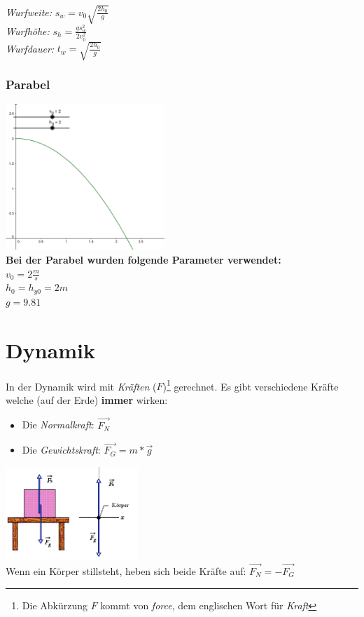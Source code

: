 \documentclass[10pt,a4paper,twoside]{article}
\begin{document}
	\begin{multicols}{2}
		\textit{Wurfweite:} \(s_w = v_0 \sqrt{ \frac{2h_0}{g} } \)\\
		\textit{Wurfhöhe:}  \(s_h = \frac{gs_w^2}{2v_0^2}\)\\
		\textit{Wurfdauer:} \(t_w = \sqrt{ \frac{2h_0}{g} }\)
	\end{multicols}
	
	\subsubsection{Parabel}
	
	\begin{multicols}{2}
		\includegraphics[width=6cm]{img/wurf_example}\\
		
		\textbf{Bei der Parabel wurden folgende Parameter verwendet:}\\
		\(v_0 = 2\frac{m}{s}\)\\
		\(h_0 = h_{y0} = 2m\)\\
		\(g = 9.81\)
	\end{multicols}
	\section{Dynamik}
	
	In der Dynamik wird mit \textit{Kräften} (\(F\))\footnote{Die Abkürzung \(F\) kommt von \textit{force}, dem englischen Wort für \textit{Kraft}} gerechnet. Es gibt verschiedene Kräfte welche (auf der Erde) \textbf{immer} wirken:
	
	\begin{itemize}
		\item Die \textit{Normalkraft}: \(\vec{F_N}\)
		\item Die \textit{Gewichtskraft}: \(\vec{F_G} = m * \vec{g}\)
	\end{itemize}
	
	
	\includegraphics[width=5cm]{img/force_example}\\
	Wenn ein Körper stillsteht, heben sich beide Kräfte auf: \( \vec{F_N} = - \vec{F_G}\)
	
\end{document}
